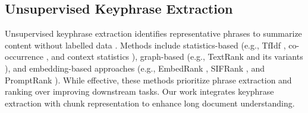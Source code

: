 \documentclass[11pt]{article}
\begin{document}
\subsection{Unsupervised Keyphrase Extraction}
Unsupervised keyphrase extraction identifies representative phrases to summarize content without labelled data \citep{hasan-ng-2014-automatic}. Methods include statistics-based (e.g., TfIdf \citep{el2009kp}, co-occurrence \citep{liu2009clustering}, and context statistics \citep{campos2020yake, won2019automatic}), graph-based (e.g., TextRank \citep{mihalcea2004textrank} and its variants \citep{wan2008single, bougouin2013topicrank, florescu2017positionrank, yu2018wikirank}), and embedding-based approaches (e.g., EmbedRank \citep{bennani2018simple}, SIFRank \citep{sun2020sifrank}, and PromptRank \citep{kong-etal-2023-promptrank}). While effective, these methods prioritize phrase extraction and ranking over improving downstream tasks. Our work integrates keyphrase extraction with chunk representation to enhance long document understanding.


\end{document}
